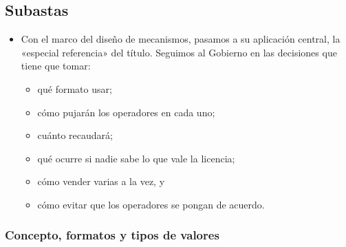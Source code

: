 \documentclass[11pt]{article}
\begin{document}
\subsection{Subastas}\label{sec:subastas}

\begin{itemize}
\item Con el marco del diseño de mecanismos, pasamos a su aplicación central, la «especial referencia» del título. Seguimos al Gobierno en las decisiones que tiene que tomar:
  \begin{itemize}
  \item qué formato usar;
  \item cómo pujarán los operadores en cada uno;
  \item cuánto recaudará;
  \item qué ocurre si nadie sabe lo que vale la licencia;
  \item cómo vender varias a la vez, y
  \item cómo evitar que los operadores se pongan de acuerdo.
  \end{itemize}
\end{itemize}

\subsubsection{Concepto, formatos y tipos de valores}\label{sec:subastas-formatos}
\end{document}
